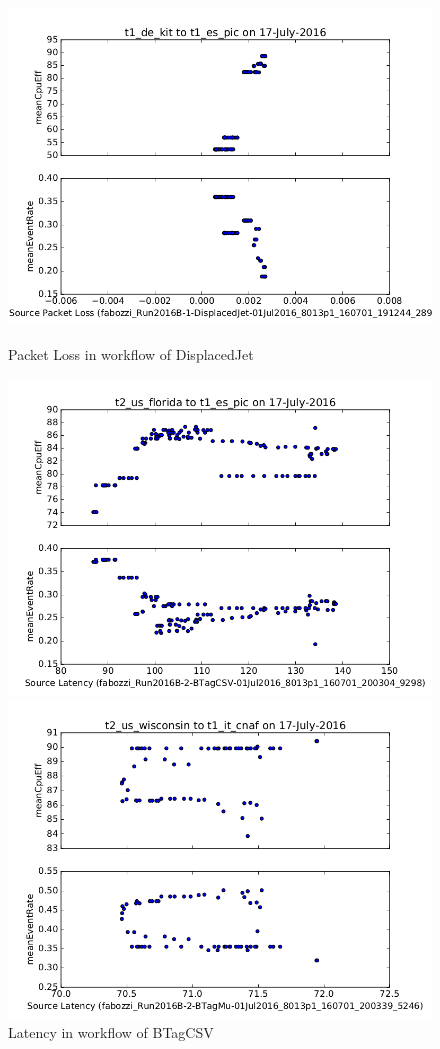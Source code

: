 \documentclass[print,ms]{nuthesis}
\begin{document}
\begin{figure}[!htb]
	\includegraphics[width=\linewidth]{displacedjet_kit_pic}
	\caption{Packet Loss in workflow of DisplacedJet}
	\label{fig:displacedjet}
	\endminipage\hfill
	\includegraphics[width=\linewidth]{btagcsv_us_pic}
	\caption{Latency in workflow of BTagCSV}
	\label{fig:btagcsv}
	\endminipage\hfill
	\includegraphics[width=\linewidth]{btagmu_us_cnaf}

\end{figure}
\end{document}
